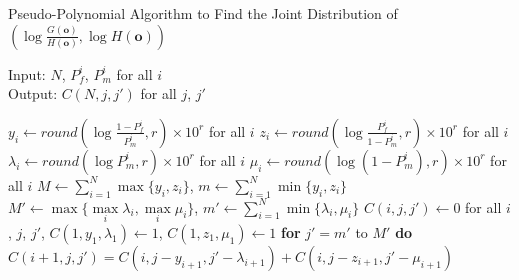 \documentclass[conference]{IEEEtran}
\begin{document}
\begin{algorithm}[t]
    \caption{{\footnotesize Pseudo-Polynomial Algorithm to Find the Joint Distribution of $(\log{\frac{G(\boldsymbol{o})}{H(\boldsymbol{o})}},\log{H(\boldsymbol{o})})$}}\label{alg:pseudo}
    {\scriptsize Input: $N$, $P_f^i$, $P_m^i$ for all $i$ \\Output: $C(N,j,j')$ for all $j$, $j'$}
    \begin{algorithmic}[1]
    {\footnotesize \STATE $y_i\leftarrow round(\log{\frac{1-P_f^i}{P_m^i}},r)\times 10^r$ for all $i$
	\STATE $z_i\leftarrow round(\log{\frac{P_f^i}{1-P_m^i}},r)\times 10^r$ for all $i$
	\STATE ${\lambda}_i\leftarrow round(\log{P_m^i},r)\times 10^r$ for all $i$
	\STATE ${\mu}_i\leftarrow round(\log{(1-P_m^i)},r)\times 10^r$ for all $i$
	\STATE $M\leftarrow \sum\limits_{i=1}^{N}{\max{\{y_i,z_i\}}}$, $m\leftarrow \sum\limits_{i=1}^{N}{\min{\{y_i,z_i\}}}$
	\STATE $M'\leftarrow\max{\{\max\limits_{i}{{\lambda}_i},\max\limits_{i}{{\mu}_i}\}}$, $m'\leftarrow\sum\limits_{i=1}^{N}{\min{\{{\lambda}_i,{\mu}_i\}}}$
	\STATE $C(i,j,j')\leftarrow 0$ for all $i$, $j$, $j'$, $C(1,y_1,{\lambda}_1)\leftarrow 1$, $C(1,z_1,{\mu}_1)\leftarrow 1$
\STATE \textbf{for} $j'=m'$ to $M'$ \textbf{do} $C(i+1,j,j')=C(i,j-y_{i+1},j'-{\lambda}_{i+1})+C(i,j-z_{i+1},j'-{\mu}_{i+1})$
			
		\ENDFOR
	\ENDFOR}
    \end{algorithmic}
\end{algorithm}
\end{document}
